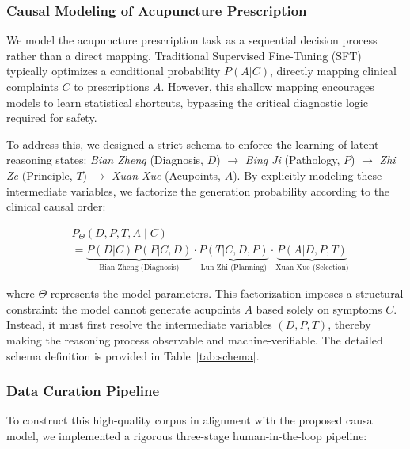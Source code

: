 \documentclass[preprint,5p,times,twocolumn,fleqn]{elsarticle}
\begin{document}
\subsubsection{Causal Modeling of Acupuncture Prescription}
We model the acupuncture prescription task as a sequential decision process rather than a direct mapping. Traditional Supervised Fine-Tuning (SFT) typically optimizes a conditional probability $P(A|C)$, directly mapping clinical complaints $C$ to prescriptions $A$. However, this shallow mapping encourages models to learn statistical shortcuts, bypassing the critical diagnostic logic required for safety.

To address this, we designed a strict schema to enforce the learning of latent reasoning states: \textit{Bian Zheng} (Diagnosis, $D$) $\rightarrow$ \textit{Bing Ji} (Pathology, $P$) $\rightarrow$ \textit{Zhi Ze} (Principle, $T$) $\rightarrow$ \textit{Xuan Xue} (Acupoints, $A$). By explicitly modeling these intermediate variables, we factorize the generation probability according to the clinical causal order:

\begin{equation}
\label{eq:scot_factor}
\begin{split}
    & P_\Theta(D,P,T,A \mid C) \\
    & = \underbrace{P(D|C)P(P|C,D)}_{\text{Bian Zheng (Diagnosis)}} \cdot \underbrace{P(T|C,D,P)}_{\text{Lun Zhi (Planning)}} \cdot \underbrace{P(A|D,P,T)}_{\text{Xuan Xue (Selection)}}
\end{split}
\end{equation}

where $\Theta$ represents the model parameters. This factorization imposes a structural constraint: the model cannot generate acupoints $A$ based solely on symptoms $C$. Instead, it must first resolve the intermediate variables $(D, P, T)$, thereby making the reasoning process observable and machine-verifiable. The detailed schema definition is provided in Table~\ref{tab:schema}.

\subsubsection{Data Curation Pipeline}
To construct this high-quality corpus in alignment with the proposed causal model, we implemented a rigorous three-stage human-in-the-loop pipeline:
\end{document}
